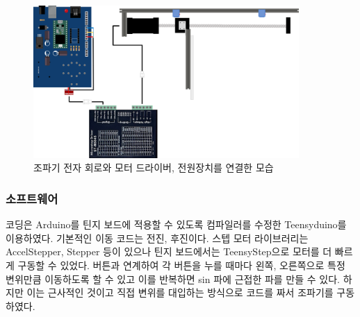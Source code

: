 

\begin{figure}[H]
        \includegraphics[width=0.9\textwidth]{images/wavemaker_control.png}
    \caption{조파기 전자 회로와 모터 드라이버, 전원장치를 연결한 모습}
    \label{wavemaker-structure}   
\end{figure}


\subsubsection{소프트웨어}
코딩은 Arduino를 틴지 보드에 적용할 수 있도록 컴파일러를 수정한 Teensyduino를 이용하였다. 기본적인 이동 코드는 전진, 후진이다. 스텝 모터 라이브러리는 AccelStepper, Stepper 등이 있으나 틴지 보드에서는 TeensyStep으로 모터를 더 빠르게 구동할 수 있었다. 버튼과 연계하여 각 버튼을 누를 때마다 왼쪽, 오른쪽으로 특정 변위만큼 이동하도록 할 수 있고 이를 반복하면 sin 파에 근접한 파를 만들 수 있다. 하지만 이는 근사적인 것이고 직접 변위를 대입하는 방식으로 코드를 짜서 조파기를 구동하였다.

